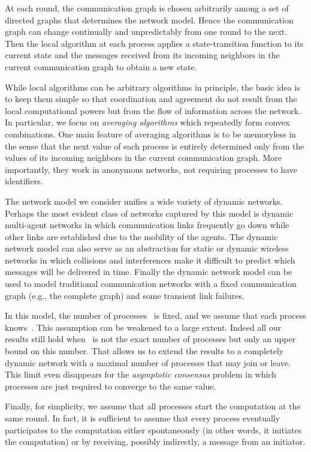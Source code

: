 \documentclass[a4paper]{article}
\theoremstyle{newthm}
\begin{document}
At each round, the communication graph is chosen arbitrarily among a  set
	of directed graphs that determines the network model.
Hence the communication graph can change continually and unpredictably from one
	round to the next.
Then the local algorithm at each process applies a state-transition function to its current state 
	and the messages received from its incoming neighbors
	in the current communication graph to obtain a new state. 

While local algorithms can be arbitrary algorithms in principle, the basic idea is to keep them simple
	so that coordination and agreement do not result from the local computational powers
	but from the flow of information across the network.
In particular, we focus on {\em averaging algorithms} which  repeatedly form convex combinations.
One main feature of averaging algorithms is to be memoryless in the sense that 
	the next value of each process is entirely determined only from the values
	of its incoming neighbors in the current communication graph.
More importantly, they work in anonymous networks, not requiring processes to have identifiers.


The  network model we consider unifies a wide variety of dynamic networks. 
Perhaps the most evident class of networks captured by this model is dynamic multi-agent networks
	in which communication links frequently go down while other links are established
	due to the mobility of the agents.
The dynamic network model can also serve as an abstraction for static or dynamic wireless
	networks in which collisions and interferences make it difficult to predict which messages 
	will be delivered in time.
Finally the dynamic network model  can be used to model traditional communication networks
	with a fixed communication graph (e.g., the complete graph) and some transient link failures.
	
In this model, the number of processes~ is fixed, and we assume that each process
	knows~.
This assumption can be weakened to a large extent.
Indeed all our results still hold when~ is not the exact number of processes
	but only an upper bound on this number.
That allows us to extend the results to a completely dynamic network
	with  a maximal number of processes  that may join or
	leave.
This limit even disappears for the {\em asymptotic consensus} problem
	in which  processes are just required to converge to the same value.
	
Finally, for simplicity, we  assume that all processes start the computation at the same 
	round. 
In fact, it is sufficient to assume that every process eventually participates to the
	computation either spontaneously (in other words,  it initiates the computation)
	or by receiving, possibly indirectly, a message from an initiator.
\end{document}
